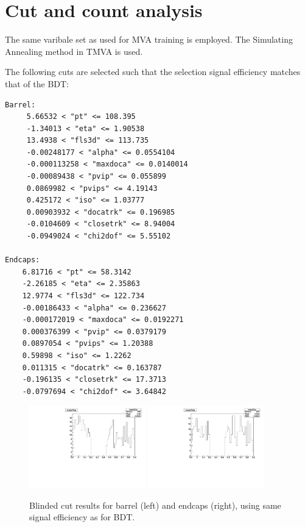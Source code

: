 \section{Cut and count analysis}


The same varibale set as used for MVA training is employed.
The Simulating Annealing method in TMVA is used.

The following cuts are selected such that the selection signal efficiency matches that of the BDT:

\begin{verbatim}
Barrel:
	 5.66532 < "pt" <= 108.395
	 -1.34013 < "eta" <= 1.90538
	 13.4938 < "fls3d" <= 113.735
	 -0.00248177 < "alpha" <= 0.0554104
	 -0.000113258 < "maxdoca" <= 0.0140014
	 -0.00089438 < "pvip" <= 0.055899
	 0.0869982 < "pvips" <= 4.19143
	 0.425172 < "iso" <= 1.03777
	 0.00903932 < "docatrk" <= 0.196985
	 -0.0104609 < "closetrk" <= 8.94004
	 -0.0949024 < "chi2dof" <= 5.55102

Endcaps:
	6.81716 < "pt" <= 58.3142
	-2.26185 < "eta" <= 2.35863
	12.9774 < "fls3d" <= 122.734
	-0.00186433 < "alpha" <= 0.236627
	-0.000172019 < "maxdoca" <= 0.0192271
	0.000376399 < "pvip" <= 0.0379179
	0.0897054 < "pvips" <= 1.20388
	0.59898 < "iso" <= 1.2262
	0.011315 < "docatrk" <= 0.163787
	-0.196135 < "closetrk" <= 17.3713
	-0.0797694 < "chi2dof" <= 3.64842
\end{verbatim}





\begin{figure}[!h]
  \centering
  \includegraphics[width=0.45\textwidth]{Figures/cnt/SA_barrel_mass}
  \includegraphics[width=0.45\textwidth]{Figures/cnt/SA_endcaps_mass}
\caption{Blinded cut results for barrel (left) and endcaps (right), using same signal efficiency as for BDT.}
\end{figure}

